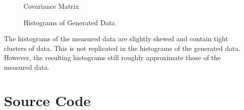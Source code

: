 \documentclass[fleqn]{article}
\begin{document}
\begin{enumerate}
\begin{enumerate}
			\begin{figure}[H]
				\centerline{}
				\caption{Covariance Matrix}
				\label{covariance_matrix}
			\end{figure}
			
			\begin{figure}[H]
				\centerline{}
				\caption{Histograms of Generated Data}
				\label{generated_data_histogram}
			\end{figure}
			
			The histograms of the measured data are slightly skewed and contain tight clusters of data. This is not replicated in the histograms of the generated data. However, the resulting histograms still roughly approximate those of the measured data.	
		\end{enumerate}
	\end{enumerate}
	
	\pagebreak
	\appendix
	\section{Source Code}
	\label{source_code}
	\lstset{style=Matlab-editor,basicstyle=\ttfamily\footnotesize}
	
	
	
	\raggedbottom
\end{document}

